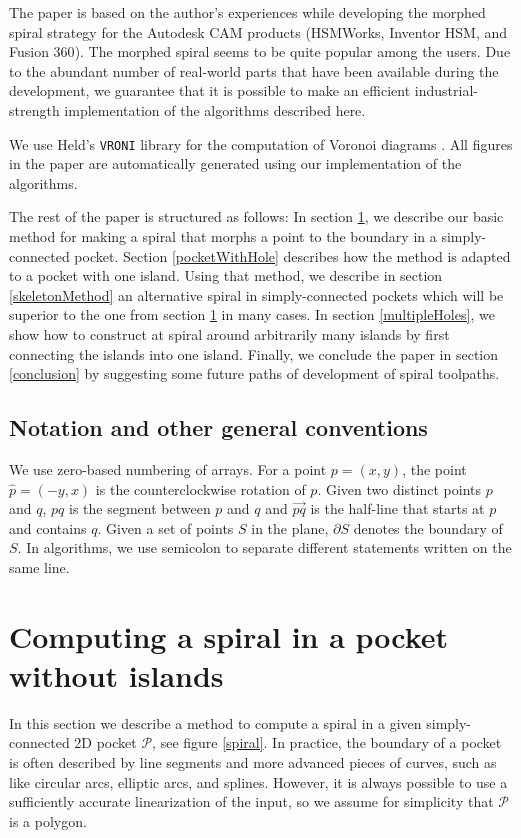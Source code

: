 \documentclass[3p]{elsarticle}
\newcommand{\PP}{\mathcal{P}}
\newcommand{\ora}[1]{\overrightarrow{#1}}
\begin{document}
The paper is based on the author's experiences while developing the morphed spiral strategy for the
Autodesk\texttrademark{} CAM products (HSMWorks,
Inventor HSM\textsuperscript{\textregistered}, and Fusion 360\textsuperscript{\textregistered}).
The morphed spiral seems to be quite popular among the users.
Due to the abundant number of real-world parts that have been available during the development,
we guarantee that it is possible
to make an efficient industrial-strength implementation of the algorithms described here.

We use Held's \texttt{VRONI} library for the computation of Voronoi diagrams \cite{held2001}.
All figures in the paper are automatically generated using our implementation of the algorithms.

The rest of the paper is structured as follows:
In section \ref{withoutHoles}, we describe our basic method for making a spiral
that morphs a point to the boundary in a simply-connected pocket.
Section \ref{pocketWithHole} describes how the method is adapted to a pocket with one island.
Using that method, we describe in section \ref{skeletonMethod} an alternative spiral in simply-connected pockets which will be superior to the one from section \ref{withoutHoles} in many cases.
In section \ref{multipleHoles}, we show how to construct at spiral
around arbitrarily many islands by first connecting the islands into one island.
Finally, we conclude the paper in section \ref{conclusion}
by suggesting some future paths of development of spiral
toolpaths.

\subsection{Notation and other general conventions}
We use zero-based numbering of arrays.
For a point $p=(x,y)$, the point $\widehat p=(-y,x)$ is the counterclockwise rotation of $p$.
Given two distinct points $p$ and $q$, $pq$ is the segment between $p$ and $q$
and $\ora{pq}$ is the half-line that starts at $p$ and contains $q$.
Given a set of points $S$ in the plane, $\partial S$ denotes the boundary of $S$.
In algorithms, we
use semicolon to separate different statements written on the same line.

\section{Computing a spiral in a pocket without islands}\label{withoutHoles}

In this section we describe a method to compute a spiral in a given simply-connected
2D pocket $\PP$, see figure \ref{spiral}.
In practice, the boundary of a pocket is often described by line segments and more advanced pieces of
curves, such as like circular arcs, elliptic arcs, and splines.
However, it is always possible to use a sufficiently accurate linearization of the input,
so we assume for simplicity that $\PP$ is a polygon.
\end{document}
